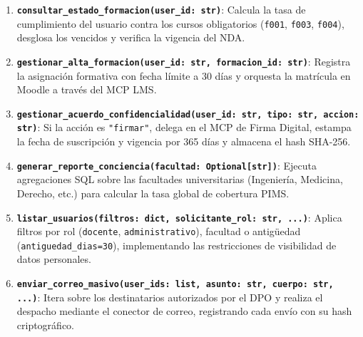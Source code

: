 \documentclass[11pt,a4paper]{article}
\begin{document}
\begin{enumerate}
    \item \textbf{\texttt{consultar\_estado\_formacion(user\_id: str)}}: Calcula la tasa de cumplimiento del usuario contra los cursos obligatorios (\texttt{f001}, \texttt{f003}, \texttt{f004}), desglosa los vencidos y verifica la vigencia del NDA.
    \item \textbf{\texttt{gestionar\_alta\_formacion(user\_id: str, formacion\_id: str)}}: Registra la asignación formativa con fecha límite a 30 días y orquesta la matrícula en Moodle a través del MCP LMS.
    \item \textbf{\texttt{gestionar\_acuerdo\_confidencialidad(user\_id: str, tipo: str, accion: str)}}: Si la acción es \texttt{"firmar"}, delega en el MCP de Firma Digital, estampa la fecha de suscripción y vigencia por 365 días y almacena el hash SHA-256.
    \item \textbf{\texttt{generar\_reporte\_conciencia(facultad: Optional[str])}}: Ejecuta agregaciones SQL sobre las facultades universitarias (Ingeniería, Medicina, Derecho, etc.) para calcular la tasa global de cobertura PIMS.
    \item \textbf{\texttt{listar\_usuarios(filtros: dict, solicitante\_rol: str, ...)}}: Aplica filtros por rol (\texttt{docente}, \texttt{administrativo}), facultad o antigüedad (\texttt{antiguedad\_dias=30}), implementando las restricciones de visibilidad de datos personales.
    \item \textbf{\texttt{enviar\_correo\_masivo(user\_ids: list, asunto: str, cuerpo: str, ...)}}: Itera sobre los destinatarios autorizados por el DPO y realiza el despacho mediante el conector de correo, registrando cada envío con su hash criptográfico.
\end{enumerate}
\end{document}
